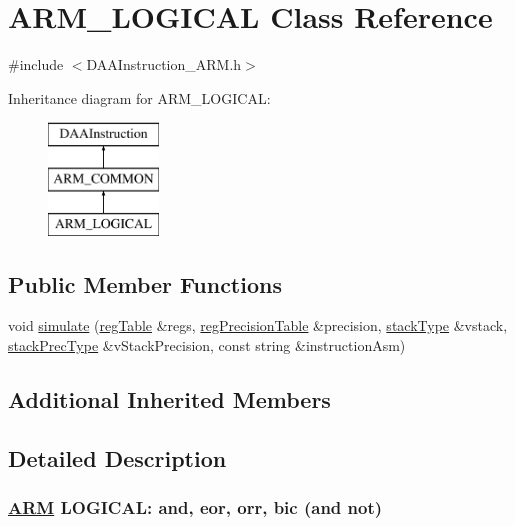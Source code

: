 \hypertarget{classARM__LOGICAL}{}\section{A\+R\+M\+\_\+\+L\+O\+G\+I\+C\+AL Class Reference}
\label{classARM__LOGICAL}


{\ttfamily \#include $<$D\+A\+A\+Instruction\+\_\+\+A\+R\+M.\+h$>$}

Inheritance diagram for A\+R\+M\+\_\+\+L\+O\+G\+I\+C\+AL\+:\begin{figure}[H]
\begin{center}
\leavevmode
\includegraphics[height=3.000000cm]{classARM__LOGICAL}
\end{center}
\end{figure}
\subsection*{Public Member Functions}
\begin{DoxyCompactItemize}
\item 
void \hyperlink{classARM__LOGICAL_a6359a7daad8f3ddbe314a378e030bf1b}{simulate} (\hyperlink{DAAInstruction_8h_af0fae93a861de9cf37988d5673cac523}{reg\+Table} \&regs, \hyperlink{DAAInstruction_8h_a0e8cae02815a5f8adc750122d790b455}{reg\+Precision\+Table} \&precision, \hyperlink{DAAInstruction_8h_a1b0e70ac1a04f06c8132055ed01f589f}{stack\+Type} \&vstack, \hyperlink{DAAInstruction_8h_ac5cb793e9dac3fa9693da78b7e29ab30}{stack\+Prec\+Type} \&v\+Stack\+Precision, const string \&instruction\+Asm)
\end{DoxyCompactItemize}
\subsection*{Additional Inherited Members}


\subsection{Detailed Description}


 \subsubsection*{\hyperlink{classARM}{A\+RM} L\+O\+G\+I\+C\+AL\+: and, eor, orr, bic (and not) }

